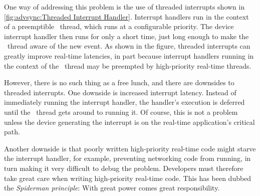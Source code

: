 
One way of addressing this problem is the use of threaded interrupts shown in
\cref{fig:advsync:Threaded Interrupt Handler}.
Interrupt handlers run in the context of a preemptible \IRQ\ thread,
which runs at a configurable priority.
The device interrupt handler then runs for only a short time, just
long enough to make the \IRQ\ thread aware of the new event.
As shown in the figure, threaded interrupts can greatly improve
real-time latencies, in part because interrupt handlers running in
the context of the \IRQ\ thread may be preempted by high-priority real-time
threads.

However, there is no such thing as a free lunch, and there are downsides
to threaded interrupts.
One downside is increased interrupt latency.
Instead of immediately running the interrupt handler, the handler's execution
is deferred until the \IRQ\ thread gets around to running it.
Of course, this is not a problem unless the device generating the interrupt
is on the real-time application's critical path.

Another downside is that poorly written high-priority real-time code
might starve the interrupt handler, for example, preventing networking
code from running, in turn making it very difficult to debug the problem.
Developers must therefore take great care when writing high-priority
real-time code.
This has been dubbed the \emph{Spiderman principle}: With great power
comes great responsibility.

